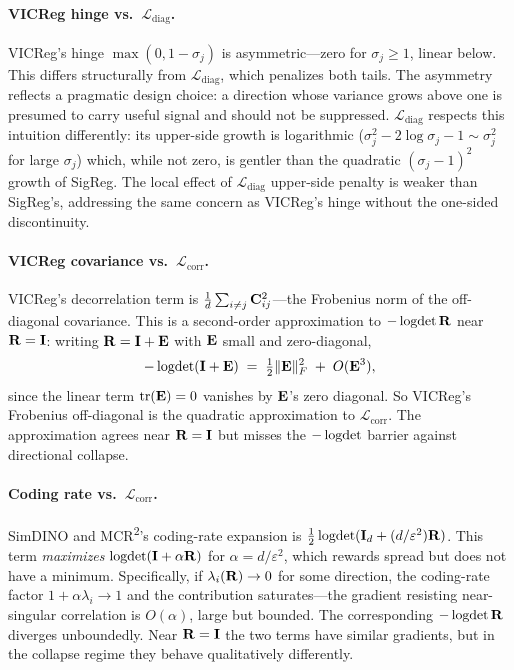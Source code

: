\paragraph{VICReg hinge vs.\ $\mathcal{L}_\text{diag}$.}
VICReg's hinge $\max(0, 1 - \sigma_j)$ is asymmetric---zero for $\sigma_j \ge 1$, linear below. This differs structurally from $\mathcal{L}_\text{diag}$, which penalizes both tails. The asymmetry reflects a pragmatic design choice: a direction whose variance grows above one is presumed to carry useful signal and should not be suppressed. $\mathcal{L}_\text{diag}$ respects this intuition differently: its upper-side growth is logarithmic ($\sigma_j^2 - 2\log\sigma_j - 1 \sim \sigma_j^2$ for large $\sigma_j$) which, while not zero, is gentler than the quadratic $(\sigma_j - 1)^2$ growth of SigReg. The local effect of $\mathcal{L}_\text{diag}$ upper-side penalty is weaker than SigReg's, addressing the same concern as VICReg's hinge without the one-sided discontinuity.

\paragraph{VICReg covariance vs.\ $\mathcal{L}_\text{corr}$.}
VICReg's decorrelation term is $\tfrac{1}{d}\sum_{i \ne j} \mathbf{C}_{ij}^2$---the Frobenius norm of the off-diagonal covariance. This is a second-order approximation to $-\operatorname{logdet}\mathbf{R}$ near $\mathbf{R} = \mathbf{I}$: writing $\mathbf{R} = \mathbf{I} + \mathbf{E}$ with $\mathbf{E}$ small and zero-diagonal,
\begin{equation}
    -\operatorname{logdet}(\mathbf{I} + \mathbf{E}) \;=\; \tfrac{1}{2}\|\mathbf{E}\|_F^2 \;+\; O(\mathbf{E}^3),
\end{equation}
since the linear term $\operatorname{tr}(\mathbf{E}) = 0$ vanishes by $\mathbf{E}$'s zero diagonal. So VICReg's Frobenius off-diagonal is the quadratic approximation to $\mathcal{L}_\text{corr}$. The approximation agrees near $\mathbf{R} = \mathbf{I}$ but misses the $-\operatorname{logdet}$ barrier against directional collapse.

\paragraph{Coding rate vs.\ $\mathcal{L}_\text{corr}$.}
SimDINO and MCR\textsuperscript{2}'s coding-rate expansion is $\tfrac{1}{2}\operatorname{logdet}(\mathbf{I}_d + (d/\varepsilon^2)\mathbf{R})$. This term \emph{maximizes} $\operatorname{logdet}(\mathbf{I} + \alpha \mathbf{R})$ for $\alpha = d/\varepsilon^2$, which rewards spread but does not have a minimum. Specifically, if $\lambda_i(\mathbf{R}) \to 0$ for some direction, the coding-rate factor $1 + \alpha\lambda_i \to 1$ and the contribution saturates---the gradient resisting near-singular correlation is $O(\alpha)$, large but bounded. The corresponding $-\operatorname{logdet}\mathbf{R}$ diverges unboundedly. Near $\mathbf{R} = \mathbf{I}$ the two terms have similar gradients, but in the collapse regime they behave qualitatively differently.

